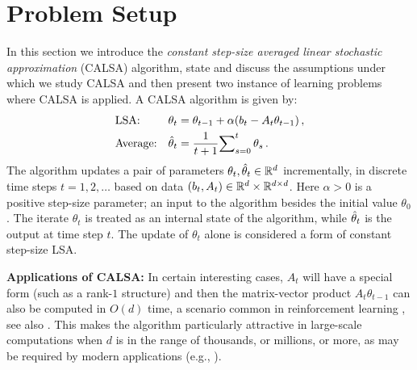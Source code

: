 \section{Problem Setup}\label{sec:prob}
In this section we introduce the \emph{constant step-size averaged linear stochastic approximation} (CALSA) algorithm, state and discuss the assumptions under which we study CALSA and then present two instance of learning problems where CALSA is applied. A  CALSA algorithm is given by:
\begin{subequations}\label{eq:lsa}
\begin{align}
\label{conststep}&\text{LSA:} &\theta_t&=\theta_{t-1}+\alpha(b_t-A_t\theta_{t-1})\,,\\
\label{iteravg}&\text{Average:} &\hat{\theta}_t&=\frac{1}{t+1}{\sum}_{s=0}^{t}\,\theta_s\,.
\end{align}
\end{subequations}
The algorithm updates a pair of parameters $\theta_t,\hat{\theta}_t\in \mathbb{R}^{d}$ incrementally, in discrete time steps $t=1,2,\dots$
based on data $(b_t,A_t)\in \mathbb{R}^d\times\mathbb{R}^{d \times d}$. Here $\alpha>0$ is a positive step-size parameter; an input to the algorithm besides the
initial value $\theta_0$. The iterate $\theta_t$ is treated as an internal state of the algorithm, while $\hat{\theta}_t$ is the output at time step $t$. The update of $\theta_t$ alone is considered a form of constant step-size LSA.

\textbf{Applications of CALSA:} In certain interesting cases, $A_t$ will have a special form (such as a rank-$1$ structure) and then the matrix-vector product $A_t \theta_{t-1}$ can also be computed in $O(d)$ time, a scenario common in reinforcement learning \cite{sutton,konda-tsitsiklis,gtd,gtd2,gtdmp}, see also . This makes the algorithm particularly attractive in large-scale computations when $d$ is in the range of thousands, or millions, or more, as may be required by modern applications (e.g., \citep{LiMaTaBo16}). 

